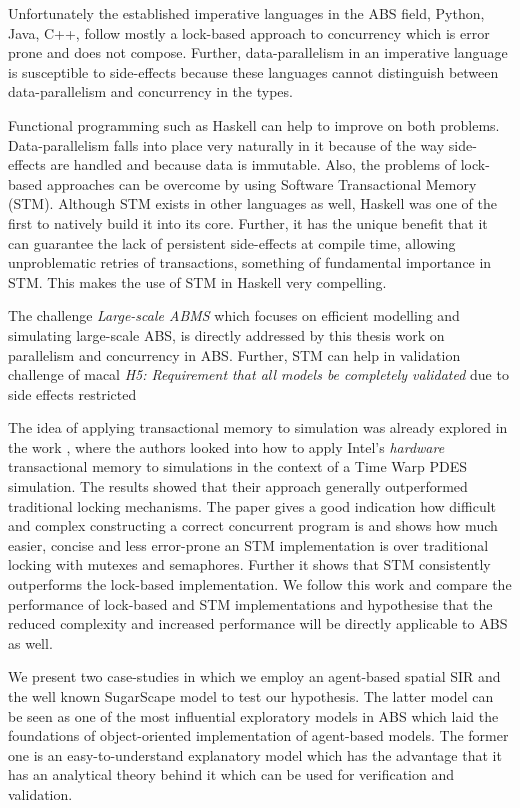 Unfortunately the established imperative languages in the ABS field, Python, Java, C++, follow mostly a lock-based approach to concurrency which is error prone and does not compose. Further, data-parallelism in an imperative language is susceptible to side-effects because these languages cannot distinguish between data-parallelism and concurrency in the types. 

Functional programming such as Haskell \citep{hudak_history_2007} can help to improve on both problems. Data-parallelism falls into place very naturally in it because of the way side-effects are handled and because data is immutable. Also, the problems of lock-based approaches can be overcome by using Software Transactional Memory (STM). Although STM exists in other languages as well, Haskell was one of the first to natively build it into its core. Further, it has the unique benefit that it can guarantee the lack of persistent side-effects at compile time, allowing unproblematic retries of transactions, something of fundamental importance in STM. This makes the use of STM in Haskell very compelling.

The challenge \textit{Large-scale ABMS} which focuses on efficient modelling and simulating large-scale ABS, is directly addressed by this thesis work on parallelism and concurrency in ABS. Further, STM can help in validation challenge of macal \emph{H5: Requirement that all models be completely validated} due to side effects restricted

The idea of applying transactional memory to simulation was already explored in the work \cite{hay_experiments_2015}, where the authors looked into how to apply Intel’s \textit{hardware} transactional memory to simulations in the context of a Time Warp PDES simulation. The results showed that their approach generally outperformed traditional locking mechanisms. The paper \cite{discolo_lock_2006} gives a good indication how difficult and complex constructing a correct concurrent program is and shows how much easier, concise and less error-prone an STM implementation is over traditional locking with mutexes and semaphores. Further it shows that STM consistently outperforms the lock-based implementation. We follow this work and compare the performance of lock-based and STM implementations and hypothesise that the reduced complexity and increased performance will be directly applicable to ABS as well.

We present two case-studies in which we employ an agent-based spatial SIR \citep{macal_agent-based_2010, thaler_pure_2019} and the well known SugarScape \citep{epstein_growing_1996} model to test our hypothesis. The latter model can be seen as one of the most influential exploratory models in ABS which laid the foundations of object-oriented implementation of agent-based models. The former one is an easy-to-understand explanatory model which has the advantage that it has an analytical theory behind it which can be used for verification and validation. 


